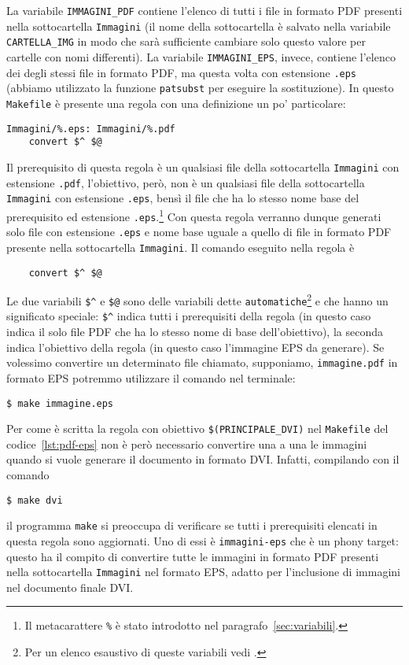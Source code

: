 La variabile \texttt{IMMAGINI\_PDF} contiene l'elenco di tutti i file in formato
\textsc{PDF} presenti nella sottocartella \texttt{Immagini} (il nome della
sottocartella è salvato nella variabile \texttt{CARTELLA\_IMG} in modo che sarà
sufficiente cambiare solo questo valore per cartelle con nomi differenti).  La
variabile \texttt{IMMAGINI\_EPS}, invece, contiene l'elenco dei degli stessi
file in formato \textsc{PDF}, ma questa volta con estensione \texttt{.eps}
(abbiamo utilizzato la funzione \texttt{patsubst} per eseguire la sostituzione).
In questo \texttt{Makefile} è presente una regola con una definizione un po'
particolare:
\begin{lstlisting}
Immagini/%.eps: Immagini/%.pdf
	convert $^ $@
\end{lstlisting}
Il prerequisito di questa regola è un qualsiasi file della sottocartella
\texttt{Immagini} con estensione \texttt{.pdf}, l'obiettivo, però, non è un
qualsiasi file della sottocartella \texttt{Immagini} con estensione
\texttt{.eps}, bensì il file che ha lo stesso nome base del prerequisito ed
estensione
\texttt{.eps}.\footnote{Il metacarattere \texttt{\%} è stato introdotto nel
  paragrafo~\ref{sec:variabili}.}
Con questa regola verranno dunque generati solo file con estensione
\texttt{.eps} e nome base uguale a quello di file in formato \textsc{PDF}
presente nella sottocartella \texttt{Immagini}.  Il comando eseguito nella
regola è
\begin{lstlisting}
	convert $^ $@
\end{lstlisting}
Le due variabili \texttt{\$\^} e \texttt{\$@} sono delle variabili dette
\texttt{automatiche}\footnote{Per un elenco esaustivo di queste variabili vedi
  \textcite[112]{gnu:make}.}
e che hanno un significato speciale: \texttt{\$\^} indica tutti i prerequisiti
della regola (in questo caso indica il solo file \textsc{PDF} che ha lo stesso
nome di base dell'obiettivo), la seconda indica l'obiettivo della regola (in
questo caso l'immagine \textsc{EPS} da generare).  Se volessimo convertire un
determinato file chiamato, supponiamo, \texttt{immagine.pdf} in formato
\textsc{EPS} potremmo utilizzare il comando nel terminale:
\begin{verbatim}
$ make immagine.eps
\end{verbatim} %
Per come è scritta la regola con obiettivo \texttt{\$(PRINCIPALE\_DVI)} nel
\texttt{Makefile} del codice~\ref{lst:pdf-eps} non è però necessario convertire
una a una le immagini quando si vuole generare il documento in formato
\textsc{DVI}.  Infatti, compilando con il comando
\begin{verbatim}
$ make dvi
\end{verbatim} %
il programma \texttt{make} si preoccupa di verificare se tutti i prerequisiti
elencati in questa regola sono aggiornati.  Uno di essi è \texttt{immagini-eps}
che è un phony target: questo ha il compito di convertire tutte le immagini in
formato \textsc{PDF} presenti nella sottocartella \texttt{Immagini} nel formato
\textsc{EPS}, adatto per l'inclusione di immagini nel documento finale
\textsc{DVI}.

